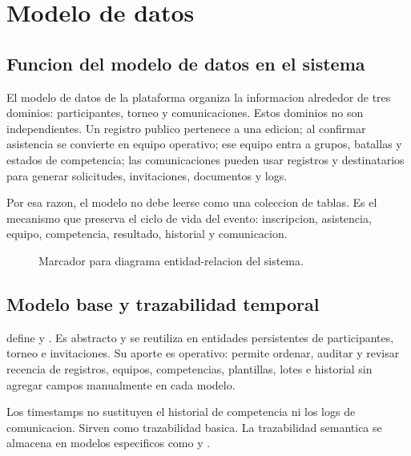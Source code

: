 \chapter{Modelo de datos}
\label{chap:modelo-datos}

\section{Funcion del modelo de datos en el sistema}
\label{sec:modelo-funcion}

El modelo de datos de la plataforma organiza la informacion alrededor de tres dominios: participantes, torneo y comunicaciones. Estos dominios no son independientes. Un registro publico pertenece a una edicion; al confirmar asistencia se convierte en equipo operativo; ese equipo entra a grupos, batallas y estados de competencia; las comunicaciones pueden usar registros y destinatarios para generar solicitudes, invitaciones, documentos y logs.

Por esa razon, el modelo no debe leerse como una coleccion de tablas. Es el mecanismo que preserva el ciclo de vida del evento: inscripcion, asistencia, equipo, competencia, resultado, historial y comunicacion.

\begin{figure}[H]
  \centering
  \caption{Marcador para diagrama entidad-relacion del sistema.}
  \label{fig:modelo-er}
\end{figure}

\section{Modelo base y trazabilidad temporal}
\label{sec:modelo-base}

 define  y . Es abstracto y se reutiliza en entidades persistentes de participantes, torneo e invitaciones. Su aporte es operativo: permite ordenar, auditar y revisar recencia de registros, equipos, competencias, plantillas, lotes e historial sin agregar campos manualmente en cada modelo.

Los timestamps no sustituyen el historial de competencia ni los logs de comunicacion. Sirven como trazabilidad basica. La trazabilidad semantica se almacena en modelos especificos como  y .

